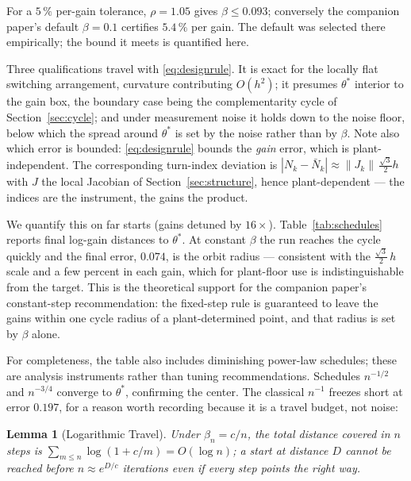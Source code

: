 \documentclass[letterpaper, 10pt, conference, twocolumn]{ieeeconf}
\newtheorem{lemma}{Lemma}
\newcommand{\Nbar}{\bar{N}}
\begin{document}
For a $5\,\%$ per-gain tolerance, $\rho = 1.05$ gives $\beta \le 0.093$;
conversely the companion paper's default $\beta = 0.1$ certifies
$5.4\,\%$ per gain. The default was selected there empirically; the bound
it meets is quantified here.

Three qualifications travel with \eqref{eq:designrule}. It is exact for the
locally flat switching arrangement, curvature contributing $O(h^2)$; it
presumes $\theta^*$ interior to the gain box, the boundary case being the
complementarity cycle of Section~\ref{sec:cycle}; and under measurement noise
it holds down to the noise floor, below which the spread around $\theta^*$ is
set by the noise rather than by $\beta$. Note also which error is bounded:
\eqref{eq:designrule} bounds the \emph{gain} error, which is
plant-independent. The corresponding turn-index deviation is
$|N_k - \Nbar_k| \approx \|J_k\| \, \tfrac{\sqrt{3}}{2} h$ with $J$ the local
Jacobian of Section~\ref{sec:structure}, hence plant-dependent --- the
indices are the instrument, the gains the product.

We quantify this on far starts (gains detuned by $16\times$).
Table~\ref{tab:schedules} reports final log-gain distances to $\theta^*$. At
constant $\beta$ the run reaches the cycle quickly and the final error,
$0.074$, is the orbit radius --- consistent with the
$\tfrac{\sqrt{3}}{2}\, h$ scale and a few percent in each gain, which for
plant-floor use is indistinguishable from the target. This is the theoretical
support for the companion paper's constant-step recommendation: the fixed-step
rule is guaranteed to leave the gains within one cycle radius of a
plant-determined point, and that radius is set by $\beta$ alone.

For completeness, the table also includes diminishing power-law schedules;
these are analysis instruments rather than tuning recommendations. Schedules
$n^{-1/2}$ and $n^{-3/4}$ converge to $\theta^*$, confirming the center. The
classical $n^{-1}$ freezes short at error $0.197$, for a reason worth
recording because it is a travel budget, not noise:

\begin{lemma}[Logarithmic Travel]
\label{lem:travel}
Under $\beta_n = c/n$, the total distance covered in $n$ steps is
$\sum_{m \le n} \log(1 + c/m) = O(\log n)$; a start at distance $D$ cannot be
reached before $n \approx e^{D/c}$ iterations even if every step points the
right way.
\end{lemma}
\end{document}
